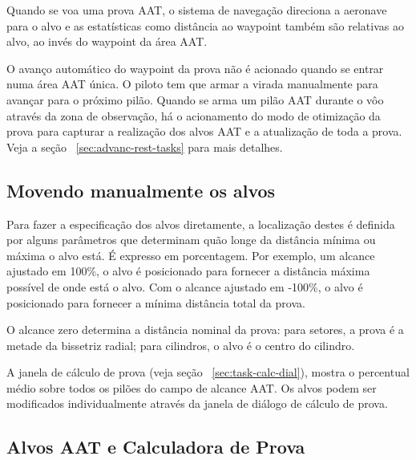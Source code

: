 Quando se voa uma prova AAT, o sistema de navegação direciona a aeronave para o alvo e as estatísticas como distância ao waypoint também são relativas ao alvo, ao invés do waypoint da área AAT.

O avanço automático do waypoint da prova não é acionado quando se entrar numa área AAT única.  O piloto tem que armar a virada manualmente para avançar para o próximo pilão.  Quando se arma um pilão AAT durante o vôo através da zona de observação, há o acionamento do modo de otimização da prova para capturar a realização dos alvos AAT e a atualização de toda a prova.   Veja a seção ~\ref{sec:advanc-rest-tasks} 
para mais detalhes.

\subsection*{Movendo manualmente os alvos}

Para fazer a especificação dos alvos diretamente, a localização destes é definida por alguns parâmetros que determinam quão longe da distância mínima ou máxima o alvo está. É expresso em porcentagem.  Por exemplo, um alcance ajustado em 100\%, o alvo é posicionado para fornecer a distância máxima possível de onde está o alvo.  Com o alcance ajustado em -100\%, o alvo é posicionado para fornecer a mínima distância total da prova.

O alcance zero determina a distância nominal da prova:  para setores, a prova é a metade da bissetriz radial; para cilindros, o alvo é o centro do cilindro.

A janela de cálculo de prova (veja seção ~\ref{sec:task-calc-dial}), mostra o percentual médio sobre todos os pilões do campo de alcance AAT.  Os alvos podem ser modificados individualmente através da janela de diálogo de cálculo de prova.


\subsection*{Alvos AAT e Calculadora de Prova}

